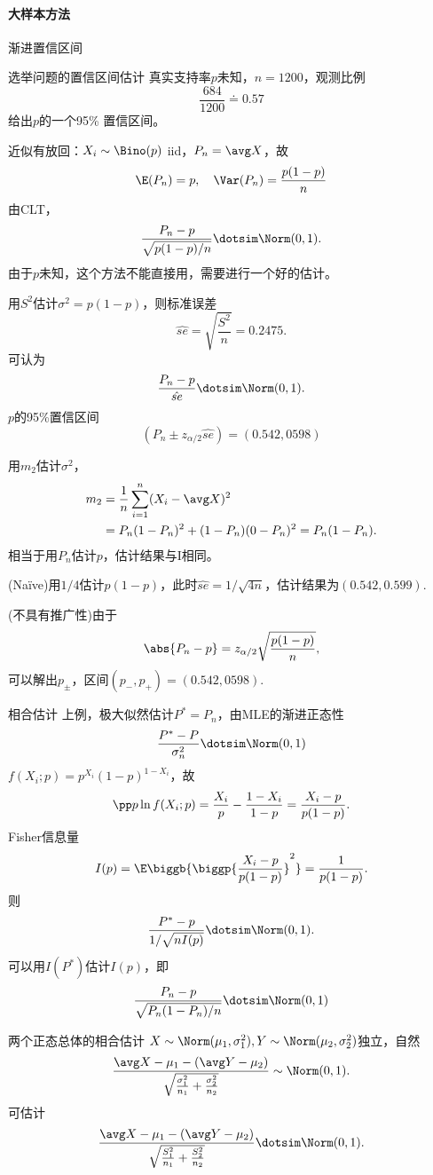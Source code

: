 \paragraph{大样本方法}
渐进置信区间
\begin{example}{选举问题的置信区间估计}{}
	真实支持率$p$未知，$n=1200$，观测比例
	\[
		\frac{684}{1200}\doteq 0.57
	\]
	给出$p$的一个95\% 置信区间。

	近似有放回：$X_i\sim\Bino(p)$ iid，$P_n=\avg X$，故
	\[
		\E(P_n)=p,\quad\Var(P_n)=\frac{p(1-p)}n
	\]
	由CLT，
	\[
		\frac{P_n-p}{\sqrt{p(1-p)/n}}\dotsim\Norm(0,1).
	\]
	由于$p$未知，这个方法不能直接用，需要进行一个好的估计。
	\begin{compactenum}[I]
		\item 用$S^2$估计$\sigma^2=p(1-p)$，则标准误差
			\[
				\hat{se}=\sqrt{\frac{S^2}n}=0.2475.
			\]
			可认为
			\[
				\frac{P_n-p}{\hat{se}}\dotsim\Norm(0,1).
			\]
			$p$的95\%置信区间
			\[
				(P_n\pm z_{\alpha/2}\hat{se})=(0.542,0598)
			\]
		\item 用$m_2$估计$\sigma^2$，
			\begin{align*}
				m_2&=\frac1n\sum_{i=1}^n(X_i-\avg X)^2\\
				&=P_n(1-P_n)^2+(1-P_n)(0-P_n)^2=P_n(1-P_n).
			\end{align*}
			相当于用$P_n$估计$p$，估计结果与I相同。
		\item (Naïve)用$1/4$估计$p(1-p)$，此时$\hat{se}=1/\sqrt{4n}$，估计结果为$(0.542,0.599).$
		\item (不具有推广性)由于 
		\[
			\abs{P_n-p}=z_{\alpha/2}\sqrt{\frac{p(1-p)}n},
		\]
		可以解出$p_\pm$，区间$(p_-,p_+)=(0.542,0598).$
	\end{compactenum}
\end{example}
\begin{example}{相合估计}{}
	上例，极大似然估计$P^\ast=P_n$，由MLE的渐进正态性
	\[
		\frac{P^\ast-P}{\sigma_n^2}\dotsim\Norm(0,1)
	\]
	$f(X_i;p)=p^{X_i}(1-p)^{1-X_i}$，故
	\[
		\pp p\ln f(X_i;p)=\frac{X_i}p-\frac{1-X_i}{1-p}=\frac{X_i-p}{p(1-p)}.
	\]
	Fisher信息量
	\[
		I(p)=\E\biggb{\biggp{\frac{X_i-p}{p(1-p)}}^2}=\frac1{p(1-p)}.
	\]
	则
	\[
		\frac{P^\ast-p}{1/\sqrt{nI(p)}}\dotsim\Norm(0,1).
	\]
	可以用$I(P^\ast)$估计$I(p)$，即
	\[
		\frac{P_n-p}{\sqrt{P_n(1-P_n)/n}}\dotsim\Norm(0,1)
	\]
\end{example}
\begin{example}{两个正态总体的相合估计}{}
	$X\sim\Norm(\mu_1,\sigma_1^2),Y\sim\Norm(\mu_2,\sigma_2^2)$独立，自然
	\[
		\frac{\avg X-\mu_1-(\avg Y-\mu_2)}{\sqrt{\frac{\sigma_1^2}{n_1}+\frac{\sigma_2^2}{n_2}}}\sim\Norm(0,1).
	\]
	可估计
	\[
		\frac{\avg X-\mu_1-(\avg Y-\mu_2)}{\sqrt{\frac{S_1^2}{n_1}+\frac{S_2^2}{n_2}}}\dotsim\Norm(0,1).
	\]
\end{example}
